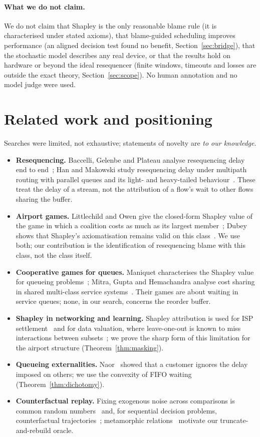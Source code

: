 \documentclass[11pt]{article}
\theoremstyle{definition}
\begin{document}
\paragraph{What we do not claim.} We do not claim that Shapley is the only reasonable blame rule (it is characterised under stated axioms), that blame-guided scheduling improves performance (an aligned decision test found no benefit, Section~\ref{sec:bridge}), that the stochastic model describes any real device, or that the results hold on hardware or beyond the ideal resequencer (finite windows, timeouts and losses are outside the exact theory, Section~\ref{sec:scope}). No human annotation and no model judge were used.

\section{Related work and positioning}\label{sec:related}
Searches were limited, not exhaustive; statements of novelty are \emph{to our knowledge}.
\begin{itemize}
  \item \textbf{Resequencing.} Baccelli, Gelenbe and Plateau analyse resequencing delay end to end~\cite{baccelli1984resequencing}; Han and Makowski study resequencing delay under multipath routing with parallel queues and its light- and heavy-tailed behaviour~\cite{han2005resequencing}. These treat the delay of a stream, not the attribution of a flow's wait to other flows sharing the buffer.
  \item \textbf{Airport games.} Littlechild and Owen give the closed-form Shapley value of the game in which a coalition costs as much as its largest member~\cite{littlechild1973airport}; Dubey shows that Shapley's axiomatisation remains valid on this class~\cite{dubey1982airport}. We use both; our contribution is the identification of resequencing blame with this class, not the class itself.
  \item \textbf{Cooperative games for queues.} Maniquet characterises the Shapley value for queueing problems~\cite{maniquet2003queueing}; Mitra, Gupta and Hemachandra analyse cost sharing in shared multi-class service systems~\cite{mitra2023shared}. Their games are about waiting in service queues; none, in our search, concerns the reorder buffer.
  \item \textbf{Shapley in networking and learning.} Shapley attribution is used for ISP settlement~\cite{ma2010shapleyisp} and for data valuation, where leave-one-out is known to miss interactions between subsets~\cite{ghorbani2019datashapley}; we prove the sharp form of this limitation for the airport structure (Theorem~\ref{thm:masking}).
  \item \textbf{Queueing externalities.} Naor~\cite{naor1969tolls} showed that a customer ignores the delay imposed on others; we use the convexity of FIFO waiting (Theorem~\ref{thm:dichotomy}).
  \item \textbf{Counterfactual replay.} Fixing exogenous noise across comparisons is common random numbers~\cite{glasserman1992crn} and, for sequential decision problems, counterfactual trajectories~\cite{oberst2019counterfactual}; metamorphic relations~\cite{chen2018metamorphic} motivate our truncate-and-rebuild oracle.
\end{itemize}
\end{document}
